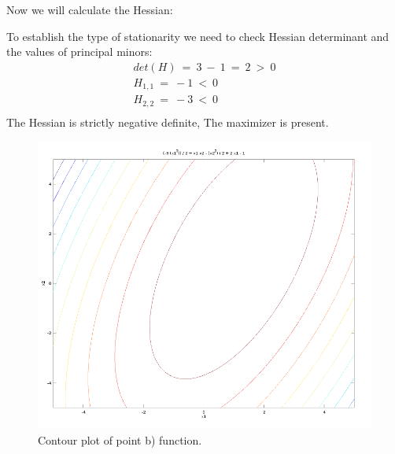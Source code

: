 \documentclass[eng,openany]{mgr}
\begin{document}
Now we will calculate the Hessian:
To establish the type of stationarity we need to check Hessian determinant and the values of principal minors:
\begin{align*}
det(H)\ =\ 3\ -\ 1\ =\ 2\ >\ 0\\
H_{1,1}\ =\ -1\ <\ 0\\
H_{2,2}\ =\ -3\ <\ 0\\
\end{align*}
The Hessian is strictly negative definite, The maximizer is present.
\\
\begin{figure}[h]
\centering
\includegraphics[width=0.7\linewidth]{screenshot005}
\caption{Contour plot of point b) function.}
\label{fig:screenshot005}
\end{figure}
\end{document}
